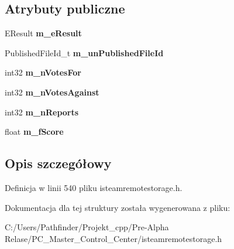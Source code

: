 \subsection*{Atrybuty publiczne}
\begin{DoxyCompactItemize}
\item 
\mbox{\label{struct_remote_storage_get_published_item_vote_details_result__t_abd77e7b08b7fccc40dd4b1061aa38946}} 
E\+Result {\bfseries m\+\_\+e\+Result}
\item 
\mbox{\label{struct_remote_storage_get_published_item_vote_details_result__t_a18cfe1187e147823fbe54f9541fad92c}} 
Published\+File\+Id\+\_\+t {\bfseries m\+\_\+un\+Published\+File\+Id}
\item 
\mbox{\label{struct_remote_storage_get_published_item_vote_details_result__t_a4563c2c0f7e711786eb3d2645b2d3fb3}} 
int32 {\bfseries m\+\_\+n\+Votes\+For}
\item 
\mbox{\label{struct_remote_storage_get_published_item_vote_details_result__t_a9a894ccdc8058f59e426923590e1d9ec}} 
int32 {\bfseries m\+\_\+n\+Votes\+Against}
\item 
\mbox{\label{struct_remote_storage_get_published_item_vote_details_result__t_a8654d404f11f7c6b635748332b066763}} 
int32 {\bfseries m\+\_\+n\+Reports}
\item 
\mbox{\label{struct_remote_storage_get_published_item_vote_details_result__t_a58e4a5cadb84f2a43ceb85c1fc405b0e}} 
float {\bfseries m\+\_\+f\+Score}
\end{DoxyCompactItemize}


\subsection{Opis szczegółowy}


Definicja w linii 540 pliku isteamremotestorage.\+h.



Dokumentacja dla tej struktury została wygenerowana z pliku\+:\begin{DoxyCompactItemize}
\item 
C\+:/\+Users/\+Pathfinder/\+Projekt\+\_\+cpp/\+Pre-\/\+Alpha Relase/\+P\+C\+\_\+\+Master\+\_\+\+Control\+\_\+\+Center/isteamremotestorage.\+h\end{DoxyCompactItemize}
